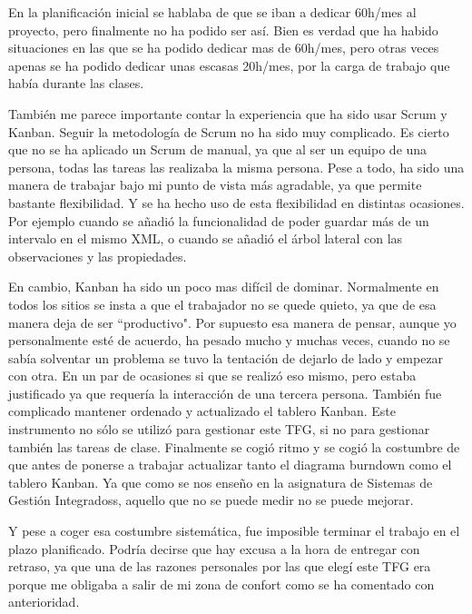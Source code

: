 En la planificaci\'on inicial se hablaba de que se iban a dedicar 60h/mes al proyecto,
pero finalmente no ha podido ser as\'i. Bien es verdad que ha habido situaciones en las
que se ha podido dedicar mas de 60h/mes, pero otras veces apenas se ha podido dedicar
unas escasas 20h/mes, por la carga de trabajo que hab\'ia durante las clases.

Tambi\'en me parece importante contar la experiencia que ha sido usar Scrum y Kanban. 
Seguir la metodolog\'ia de Scrum no ha sido muy complicado. Es cierto que no se ha aplicado
un Scrum de manual, ya que al ser un equipo de una persona, todas las tareas las realizaba la 
misma persona. Pese a todo, ha sido una manera de trabajar bajo mi punto de vista m\'as agradable,
ya que permite bastante flexibilidad. Y se ha hecho uso de esta flexibilidad en distintas ocasiones.
Por ejemplo cuando se a\~nadi\'o la funcionalidad de poder guardar m\'as de un intervalo en el mismo
XML, o cuando se a\~nadi\'o el \'arbol lateral con las observaciones y las propiedades.

En cambio, Kanban ha sido un poco mas dif\'icil de dominar. Normalmente en todos los sitios se insta
a que el trabajador no se quede quieto, ya que de esa manera deja de ser ``productivo". Por supuesto
esa manera de pensar, aunque yo personalmente est\'e de acuerdo, ha pesado mucho y 
muchas veces, cuando no se sab\'ia solventar un problema se tuvo la tentaci\'on de dejarlo de lado
y empezar con otra. En un par de ocasiones si que se realiz\'o eso mismo, pero estaba justificado
ya que requer\'ia la interacci\'on de una tercera persona. Tambi\'en fue complicado mantener
ordenado y actualizado el tablero Kanban. Este instrumento no s\'olo se utiliz\'o para gestionar
este TFG, si no para gestionar tambi\'en las tareas de clase. Finalmente se cogi\'o ritmo
y se cogi\'o la costumbre de que antes de ponerse a trabajar actualizar tanto el diagrama burndown
como el tablero Kanban. Ya que como se nos ense\~no en la asignatura de Sistemas de Gesti\'on Integradoss,
aquello que no se puede medir no se puede mejorar.

Y pese a coger esa costumbre sistem\'atica, fue imposible terminar el trabajo en el
plazo planificado. Podr\'ia decirse que hay excusa a la hora de entregar con retraso,
ya que una de las razones personales por las que eleg\'i este TFG era porque me
obligaba a salir de mi zona de confort como se ha comentado con anterioridad.